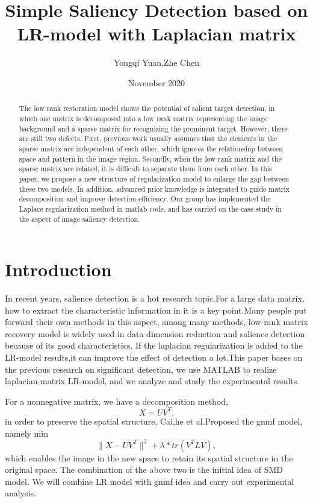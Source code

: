 \documentclass{article}
\title{\textbf{Simple Saliency Detection based on LR-model with Laplacian\- 
		matrix}}
\author{Yongqi Yuan,Zhe Chen}
\date{November 2020}
\begin{document}
\maketitle

\begin{abstract}
The low rank restoration model shows the potential of salient target detection, in which one matrix is decomposed into a low rank matrix representing the image background and a sparse matrix for recognizing the prominent target. However, there are still two defects. First, previous work usually assumes that the elements in the sparse matrix are independent of each other, which ignores the relationship between space and pattern in the image region. Secondly, when the low rank matrix and the sparse matrix are related, it is difficult to separate them from each other. In this paper, we propose a new structure of regularization model to enlarge the gap between these two models. In addition, advanced prior knowledge is integrated to guide matrix decomposition and improve detection efficiency. \citep{2017Salient}Our group has implemented the Laplace regularization method in matlab code, and has carried on the case study in the aspect of image saliency detection.
\end{abstract}

\section{Introduction}
In recent years, salience detection is a hot research topic.For a large data matrix, how to extract the characteristic information in it is a key point.Many people put forward their own methods in this aspect, among many methods, low-rank matrix recovery model is widely used in data dimension reduction and salience detection because of its good characteristics. If the laplacian regularization is added to the LR-model results,it can improve the effect of detection a lot.This paper bases on the previous research on significant detection, we use MATLAB to realize laplacian-matrix LR-model, and we analyze and study the experimental results.

For a nonnegative matrix, we have a decomposition method,$$X = UV^T.$$ in order 
to preserve the spatial structure, Cai,he et al.Proposed the gnmf 
model,\citep{2011Graph} namely min $$\| X-UV^T\|^2+\lambda*tr(V^TLV),$$ which 
enables the image in the new space to retain its spatial structure in the 
original space. The combination of the above two is the initial idea of SMD 
model. We will combine LR model with gnmf idea and carry out experimental 
analysis.
\end{document}
